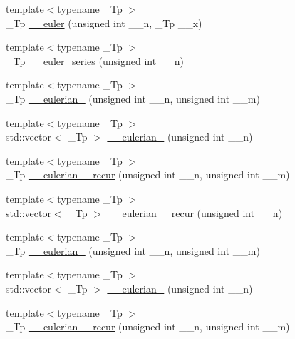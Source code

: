 \begin{DoxyCompactItemize}
{\footnotesize template$<$typename \+\_\+\+Tp $>$ }\\\+\_\+\+Tp \hyperlink{namespacestd_1_1____detail_aa44d18f565c3c36ba0351374dc4af09d}{\+\_\+\+\_\+euler} (unsigned int \+\_\+\+\_\+n, \+\_\+\+Tp \+\_\+\+\_\+x)
\item 
{\footnotesize template$<$typename \+\_\+\+Tp $>$ }\\\+\_\+\+Tp \hyperlink{namespacestd_1_1____detail_a2e3eb67dee4d0b5c96824a4e8e9c227e}{\+\_\+\+\_\+euler\+\_\+series} (unsigned int \+\_\+\+\_\+n)
\item 
{\footnotesize template$<$typename \+\_\+\+Tp $>$ }\\\+\_\+\+Tp \hyperlink{namespacestd_1_1____detail_a4556229d8792527574bfc6fa135908dd}{\+\_\+\+\_\+eulerian\+\_} (unsigned int \+\_\+\+\_\+n, unsigned int \+\_\+\+\_\+m)
\item 
{\footnotesize template$<$typename \+\_\+\+Tp $>$ }\\std\+::vector$<$ \+\_\+\+Tp $>$ \hyperlink{namespacestd_1_1____detail_ad0759105350d0c440c1b5e8957223438}{\+\_\+\+\_\+eulerian\+\_} (unsigned int \+\_\+\+\_\+n)
\item 
{\footnotesize template$<$typename \+\_\+\+Tp $>$ }\\\+\_\+\+Tp \hyperlink{namespacestd_1_1____detail_afab99319465d188432fa8357d65129e0}{\+\_\+\+\_\+eulerian\+\_\+\_\+recur} (unsigned int \+\_\+\+\_\+n, unsigned int \+\_\+\+\_\+m)
\item 
{\footnotesize template$<$typename \+\_\+\+Tp $>$ }\\std\+::vector$<$ \+\_\+\+Tp $>$ \hyperlink{namespacestd_1_1____detail_acab0c44030d62f8ff1576a33b90aa9e3}{\+\_\+\+\_\+eulerian\+\_\+\_\+recur} (unsigned int \+\_\+\+\_\+n)
\item 
{\footnotesize template$<$typename \+\_\+\+Tp $>$ }\\\+\_\+\+Tp \hyperlink{namespacestd_1_1____detail_aa93423478ed5fd1fc260cc30466bef73}{\+\_\+\+\_\+eulerian\+\_} (unsigned int \+\_\+\+\_\+n, unsigned int \+\_\+\+\_\+m)
\item 
{\footnotesize template$<$typename \+\_\+\+Tp $>$ }\\std\+::vector$<$ \+\_\+\+Tp $>$ \hyperlink{namespacestd_1_1____detail_a9c1abae84b487289ce8f798bcfe4b7e0}{\+\_\+\+\_\+eulerian\+\_} (unsigned int \+\_\+\+\_\+n)
\item 
{\footnotesize template$<$typename \+\_\+\+Tp $>$ }\\\+\_\+\+Tp \hyperlink{namespacestd_1_1____detail_a8a2a09c66c530759ae98ac1f3c1d93e5}{\+\_\+\+\_\+eulerian\+\_\+\_\+recur} (unsigned int \+\_\+\+\_\+n, unsigned int \+\_\+\+\_\+m)

\end{DoxyCompactItemize}
